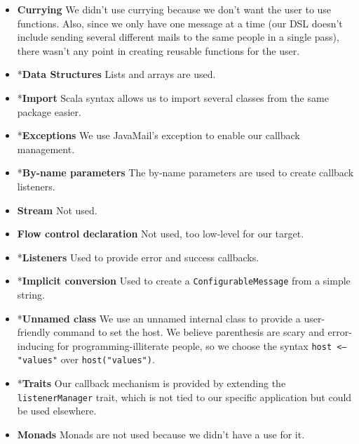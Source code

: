 \documentclass[10pt,a4paper]{article}
\begin{document}
\begin{itemize}
		\item \textbf{Currying} We didn't use currying because we don't want the user to use functions. Also, since we only have one message at a time (our DSL doesn't include sending several different mails to the same people in a single pass), there wasn't any point in creating reusable functions for the user.
		
		\item *\textbf{Data Structures} Lists and arrays are used.
		
		\item *\textbf{Import} Scala syntax allows us to import several classes from the same package easier.
		
		\item *\textbf{Exceptions} We use JavaMail's exception to enable our callback management.
		
		\item *\textbf{By-name parameters} The by-name parameters are used to create callback listeners.
		
		\item \textbf{Stream} Not used.
		
		\item \textbf{Flow control declaration} Not used, too low-level for our target.
		
		\item *\textbf{Listeners} Used to provide error and success callbacks.
		
		\item *\textbf{Implicit conversion} Used to create a \texttt{ConfigurableMessage} from a simple string.
		
		\item *\textbf{Unnamed class} We use an unnamed internal class to provide a user-friendly command to set the host. We believe parenthesis are scary and error-inducing for programming-illiterate people, so we choose the syntax \texttt{host <-- "values"} over \texttt{host("values")}.
		
		\item *\textbf{Traits} Our callback mechanism is provided by extending the \texttt{listenerManager} trait, which is not tied to our specific application but could be used elsewhere.
		
		\item \textbf{Monads} Monads are not used because we didn't have a use for it.
	\end{itemize}

\clearpage
\end{document}
